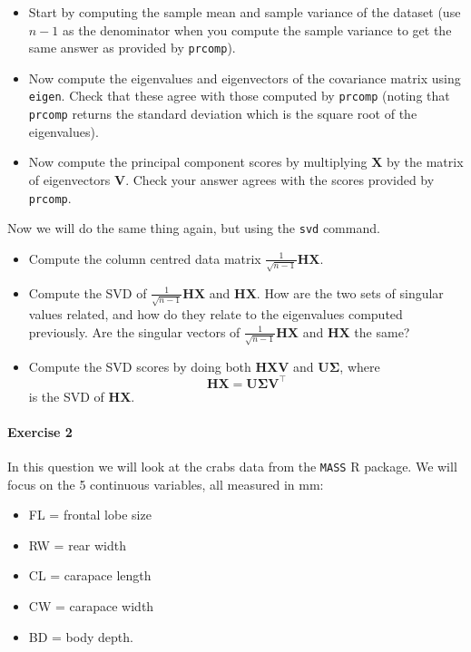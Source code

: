 \documentclass[
]{book}
\providecommand{\tightlist}{%
  \setlength{\itemsep}{0pt}\setlength{\parskip}{0pt}}
\theoremstyle{definition}
\theoremstyle{definition}
\theoremstyle{definition}
\theoremstyle{definition}
\theoremstyle{remark}
\begin{document}
\begin{itemize}
\tightlist
\item
  Start by computing the sample mean and sample variance of the dataset (use \(n-1\) as the denominator when you compute the sample variance to get the same answer as provided by \texttt{prcomp}).
\item
  Now compute the eigenvalues and eigenvectors of the covariance matrix using \texttt{eigen}. Check that these agree with those computed by \texttt{prcomp} (noting that \texttt{prcomp} returns the standard deviation which is the square root of the eigenvalues).
\item
  Now compute the principal component scores by multiplying \(\mathbf X\) by the matrix of eigenvectors \(\mathbf V\). Check your answer agrees with the scores provided by \texttt{prcomp}.
\end{itemize}

Now we will do the same thing again, but using the \texttt{svd} command.

\begin{itemize}
\item
  Compute the column centred data matrix \(\frac{1}{\sqrt{n-1}}\mathbf H\mathbf X\).
\item
  Compute the SVD of \(\frac{1}{\sqrt{n-1}}\mathbf H\mathbf X\) and \(\mathbf H\mathbf X\). How are the two sets of singular values related, and how do they relate to the eigenvalues computed previously.
  Are the singular vectors of \(\frac{1}{\sqrt{n-1}}\mathbf H\mathbf X\) and \(\mathbf H\mathbf X\) the same?
\item
  Compute the SVD scores by doing both \(\mathbf H\mathbf X\mathbf V\) and \(\mathbf U\boldsymbol{\Sigma}\), where
  \[\mathbf H\mathbf X= \mathbf U\boldsymbol{\Sigma}\mathbf V^\top\]
  is the SVD of \(\mathbf H\mathbf X\).
\end{itemize}

\hypertarget{exercise-2}{%
\paragraph*{Exercise 2}\label{exercise-2}}

In this question we will look at the crabs data from the \texttt{MASS} R package.
We will focus on the 5 continuous variables, all measured in mm:

\begin{itemize}
\tightlist
\item
  FL = frontal lobe size
\item
  RW = rear width
\item
  CL = carapace length
\item
  CW = carapace width
\item
  BD = body depth.
\end{itemize}
\end{document}
